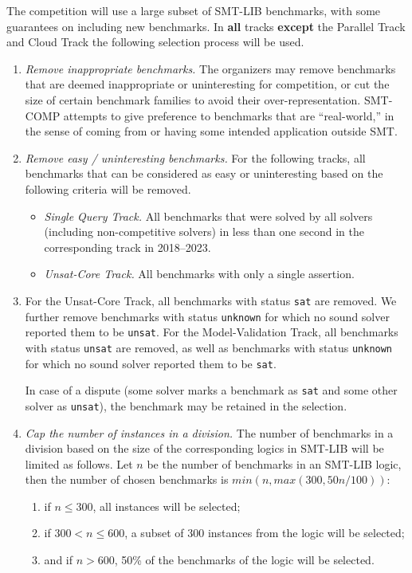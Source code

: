\documentclass[12pt]{article}
\newcommand{\maintrack}{Single Query Track\xspace}
\newcommand{\ucoretrack}{Unsat-Core Track\xspace}
\newcommand{\mvaltrack}{Model-Validation Track\xspace}
\newcommand{\paralleltrack}{Parallel Track\xspace}
\newcommand{\cloudtrack}{Cloud Track\xspace}
\begin{document}
 \label{benchmark-selection}
The competition will use a large subset of SMT-LIB benchmarks, with some
guarantees on including new benchmarks.  In \textbf{all} tracks
\textbf{except} the \paralleltrack and \cloudtrack
the following selection process will be used.
\begin{enumerate}
\item \emph{Remove inappropriate benchmarks.} The
  organizers may remove benchmarks that are deemed inappropriate or
  uninteresting for competition, or cut the size of certain benchmark
  families to avoid their over-representation.  SMT-COMP attempts to
  give preference to benchmarks that are ``real-world,'' in the sense
  of coming from or having some intended application outside SMT.
\item \emph{Remove easy / uninteresting benchmarks.}
  For the following tracks, all benchmarks that can be
  considered as easy or uninteresting based on the following criteria
  will be removed.
  \begin{itemize}
    \item \emph{\maintrack.} All benchmarks that were solved by all
      solvers (including non-competitive solvers) in less than one second in
          the corresponding track in 2018--2023.
    \item \emph{\ucoretrack.} All benchmarks with only a single assertion.
  \end{itemize}

\item
  For the \ucoretrack, all benchmarks with status
  \texttt{sat} are removed.  We further remove benchmarks with status
  \texttt{unknown} for which no sound solver reported them to be
  \texttt{unsat}.
  For the \mvaltrack,  all benchmarks with status \texttt{unsat} are removed,
  as well as benchmarks with status
  \texttt{unknown} for which no sound solver reported them to be
  \texttt{sat}.

  In case of a dispute (some solver marks a benchmark as \texttt{sat}
  and some other solver as \texttt{unsat}), the benchmark may be retained in
  the selection.

\item \emph{Cap the number of instances in a division.}
  The number of benchmarks in a division based on the size of the
  corresponding logics in SMT-LIB will be limited as follows.
  Let $n$ be the number of benchmarks in an SMT-LIB logic, then
  the number of chosen benchmarks is $min(n, max(300, 50n/100))$:
  \begin{enumerate}
  \vspace{-1ex}
    \item \label{bench-sel-300} if $n \le 300$, all instances will be selected;
  \item \label{bench-sel-600} if $300 < n \leq 600$, a subset of 300 instances
    from the logic will be selected;
  \item \label{bench-sel-more} and if $n > 600$,
      50\% of the benchmarks of the logic will be selected.
    \end{enumerate}
\end{enumerate}
\end{document}
